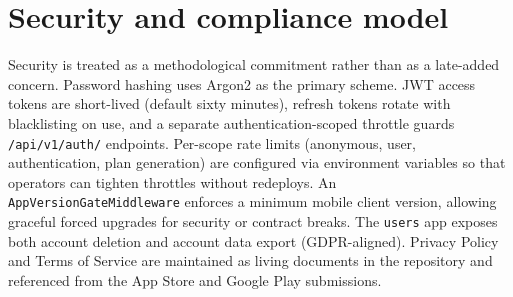 \section{Security and compliance model}

Security is treated as a methodological commitment rather than as a late-added concern. Password hashing uses Argon2 as the primary scheme. JWT access tokens are short-lived (default sixty minutes), refresh tokens rotate with blacklisting on use, and a separate authentication-scoped throttle guards \texttt{/api/v1/auth/} endpoints. Per-scope rate limits (anonymous, user, authentication, plan generation) are configured via environment variables so that operators can tighten throttles without redeploys. An \texttt{AppVersionGateMiddleware} enforces a minimum mobile client version, allowing graceful forced upgrades for security or contract breaks. The \texttt{users} app exposes both account deletion and account data export (GDPR-aligned). Privacy Policy and Terms of Service are maintained as living documents in the repository and referenced from the App Store and Google Play submissions.

\clearpage
